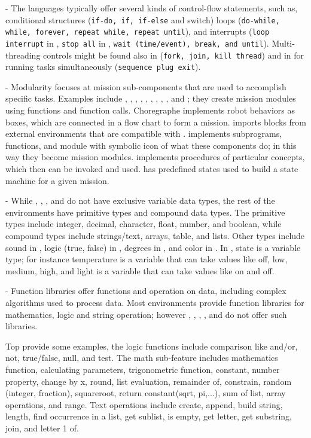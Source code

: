  - The languages typically offer several kinds of control-flow statements, such as, conditional structures (\texttt{if-do, if, if-else} and switch) loops (\texttt{do-while, while, forever, repeat while, repeat until}), and  interrupts (\texttt{loop interrupt} in \lego, \texttt{stop all} in \tello, \texttt{wait (time/event), break, and until}).
Multi-threading controls might be found also in \trik (\texttt{fork, join, kill thread}) and in  \lego for running tasks simultaneously (\texttt{sequence plug exit}).

 - Modularity focuses at mission sub-components that are used to accomplish specific tasks.
Examples include \metabot, \ardublockly, \openroberta, \choregraphe, \sphero, \robotmesh, \metabot, \makeblock, \ozoblockly, and \turtlebot; they create mission modules using functions and function calls. Choregraphe implements robot behaviors as boxes, which are connected in a flow chart to form a mission. \lego imports blocks from external environments that are compatible with \lego. \trik implements subprograms, functions, and module with symbolic icon of what these components do; in this way they become mission modules. \picaxe implements procedures of particular concepts, which then can be invoked and used.  \missionlab has predefined states used to build a state machine for a given mission. 

 - While \flyaq, \missionlab, \tivipe, and \trik do not have exclusive variable data types, the rest of the environments have primitive types and compound data types. The primitive types include integer, decimal, character, float, number, and boolean, while compound types include strings/text, arrays, table, and lists. Other types include sound in \ozoblockly, logic (true, false) in \lego, degrees in \tello, and color in \sphero. In \aseba, state is a variable type;  for instance temperature is a variable that can take values like off, low, medium, high, and light is a variable that can take values like on and off. 

 - Function libraries offer functions and operation on data, including complex algorithms used to process data. Most environments provide function libraries for mathematics, logic and string operation; however \missionlab, \flyaq, \aseba, \codelab, and \tello do not offer such libraries. 

Top provide some examples, the logic functions include comparison like and/or, not, true/false, null, and test. The math sub-feature includes mathematics function, calculating parameters, trigonometric function, constant, number property, change by x, round, list evaluation, remainder of, constrain, random (integer, fraction), squareroot, return constant(sqrt, pi,...), sum of list, array operations, and range. Text operations include create, append, build string, length, find occurrence in a list, get sublist, is empty, get letter, get substring, join, and letter 1 of.  %

